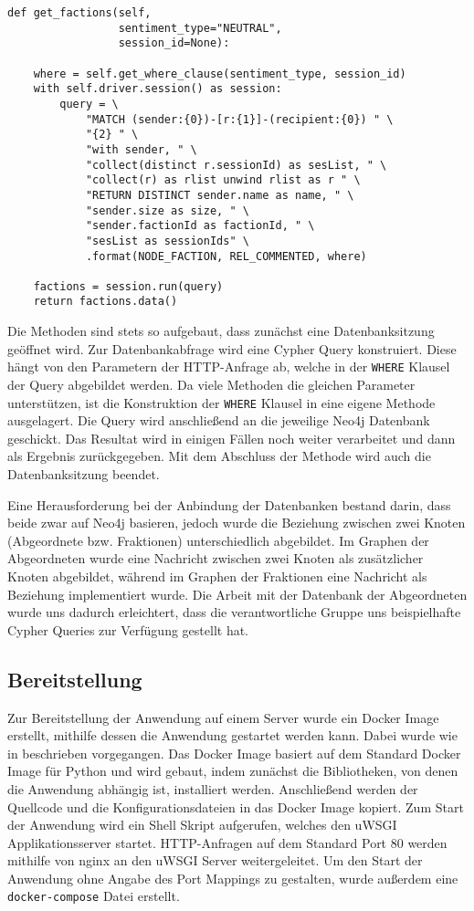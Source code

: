 \begin{lstlisting}[caption={Zugriff auf Neo4j DB: get\_factions}, captionpos=b]
def get_factions(self,
                 sentiment_type="NEUTRAL",
                 session_id=None):

    where = self.get_where_clause(sentiment_type, session_id)
    with self.driver.session() as session:
        query = \
            "MATCH (sender:{0})-[r:{1}]-(recipient:{0}) " \
            "{2} " \
            "with sender, " \
            "collect(distinct r.sessionId) as sesList, " \
            "collect(r) as rlist unwind rlist as r " \
            "RETURN DISTINCT sender.name as name, " \
            "sender.size as size, " \
            "sender.factionId as factionId, " \
            "sesList as sessionIds" \
            .format(NODE_FACTION, REL_COMMENTED, where)

    factions = session.run(query)
    return factions.data()
\end{lstlisting}

Die Methoden sind stets so aufgebaut, dass zunächst eine Datenbanksitzung geöffnet wird.
Zur Datenbankabfrage wird eine Cypher Query konstruiert. Diese hängt von den Parametern der HTTP-Anfrage ab, welche in der \lstinline|WHERE| Klausel der Query abgebildet werden.
Da viele Methoden die gleichen Parameter unterstützen, ist die Konstruktion der \lstinline|WHERE| Klausel in eine eigene Methode ausgelagert.
Die Query wird anschließend an die jeweilige Neo4j Datenbank geschickt. Das Resultat wird in einigen Fällen noch weiter verarbeitet und dann als Ergebnis zurückgegeben.
Mit dem Abschluss der Methode wird auch die Datenbanksitzung beendet.

Eine Herausforderung bei der Anbindung der Datenbanken bestand darin, dass beide zwar auf Neo4j basieren, jedoch wurde die Beziehung zwischen zwei Knoten (Abgeordnete bzw. Fraktionen) unterschiedlich abgebildet.
Im Graphen der Abgeordneten wurde eine Nachricht zwischen zwei Knoten als zusätzlicher Knoten abgebildet, während im Graphen der Fraktionen eine Nachricht als Beziehung implementiert wurde.
Die Arbeit mit der Datenbank der Abgeordneten wurde uns dadurch erleichtert, dass die verantwortliche Gruppe uns beispielhafte Cypher Queries zur Verfügung gestellt hat.

\subsection{Bereitstellung}
Zur Bereitstellung der Anwendung auf einem Server wurde ein Docker Image erstellt, mithilfe dessen die Anwendung gestartet werden kann.
Dabei wurde wie in \cite{flask_docker} beschrieben vorgegangen.
Das Docker Image basiert auf dem Standard Docker Image für Python und wird gebaut, indem zunächst die Bibliotheken, von denen die Anwendung abhängig ist, installiert werden.
Anschließend werden der Quellcode und die Konfigurationsdateien in das Docker Image kopiert.
Zum Start der Anwendung wird ein Shell Skript aufgerufen, welches den uWSGI Applikationsserver startet.
HTTP-Anfragen auf dem Standard Port 80 werden mithilfe von nginx an den uWSGI Server weitergeleitet.
Um den Start der Anwendung ohne Angabe des Port Mappings zu gestalten, wurde außerdem eine \lstinline|docker-compose| Datei erstellt.


